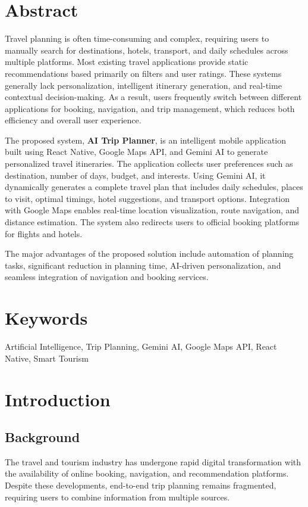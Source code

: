\documentclass[12pt,a4paper]{article}
\begin{document}
\tableofcontents
\newpage
\listoffigures
\newpage


\section{Abstract}
Travel planning is often time-consuming and complex, requiring users to manually search for destinations, hotels, transport, and daily schedules across multiple platforms. Most existing travel applications provide static recommendations based primarily on filters and user ratings. These systems generally lack personalization, intelligent itinerary generation, and real-time contextual decision-making. As a result, users frequently switch between different applications for booking, navigation, and trip management, which reduces both efficiency and overall user experience.

The proposed system, \textbf{AI Trip Planner}, is an intelligent mobile application built using React Native, Google Maps API, and Gemini AI to generate personalized travel itineraries. The application collects user preferences such as destination, number of days, budget, and interests. Using Gemini AI, it dynamically generates a complete travel plan that includes daily schedules, places to visit, optimal timings, hotel suggestions, and transport options. Integration with Google Maps enables real-time location visualization, route navigation, and distance estimation. The system also redirects users to official booking platforms for flights and hotels.

The major advantages of the proposed solution include automation of planning tasks, significant reduction in planning time, AI-driven personalization, and seamless integration of navigation and booking services.

\section{Keywords}
Artificial Intelligence, Trip Planning, Gemini AI, Google Maps API, React Native, Smart Tourism

\section{Introduction}
\subsection{Background}
The travel and tourism industry has undergone rapid digital transformation with the availability of online booking, navigation, and recommendation platforms. Despite these developments, end-to-end trip planning remains fragmented, requiring users to combine information from multiple sources.
\end{document}
